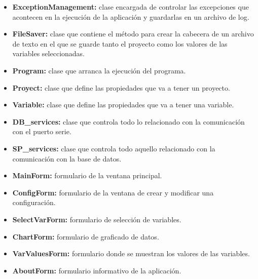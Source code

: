 \begin{itemize}
	\item \textbf{ExceptionManagement:} clase encargada de controlar las excepciones que acontecen en la ejecución de la aplicación y guardarlas en un archivo de log.
	\item \textbf{FileSaver:} clase que contiene el método para crear la cabecera de un archivo de texto en el que se guarde tanto el proyecto como los valores de las variables seleccionadas.
	\item \textbf{Program:} clase que arranca la ejecución del programa.
	\item \textbf{Proyect:} clase que define las propiedades que va a tener un proyecto.
	\item \textbf{Variable:} clase que define las propiedades que va a tener una variable.
	\item \textbf{DB\_services:} clase que controla todo lo relacionado con la comunicación con el puerto serie.
	\item \textbf{SP\_services:} clase que controla todo aquello relacionado con la comunicación con la base de datos.
	\item \textbf{MainForm:} formulario de la ventana principal.
	\item \textbf{ConfigForm:} formulario de la ventana de crear y modificar una configuración.
	\item \textbf{SelectVarForm:} formulario de selección de variables.
	\item \textbf{ChartForm:} formulario de graficado de datos.
	\item \textbf{VarValuesForm:} formulario donde se muestran los valores de las variables.
	\item \textbf{AboutForm:} formulario informativo de la aplicación.
\end{itemize}

